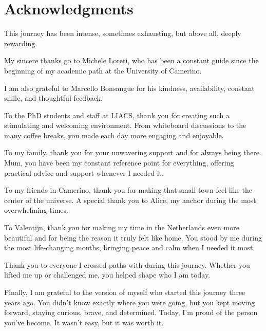 \chapter*{Acknowledgments}

This journey has been intense, sometimes exhausting, but above all, deeply rewarding.

My sincere thanks go to Michele Loreti, who has been a constant guide since the beginning of my academic path at the University of Camerino. 

I am also grateful to Marcello Bonsangue for his kindness, availability, constant smile, and thoughtful feedback.

To the PhD students and staff at LIACS, thank you for creating such a stimulating and welcoming environment. From whiteboard discussions to the many coffee breaks, you made each day more engaging and enjoyable.

To my family, thank you for your unwavering support and for always being there. Mum, you have been my constant reference point for everything, offering practical advice and support whenever I needed it.

To my friends in Camerino, thank you for making that small town feel like the center of the universe. A special thank you to Alice, my anchor during the most overwhelming times.

To Valentijn, thank you for making my time in the Netherlands even more beautiful and for being the reason it truly felt like home. You stood by me during the most life-changing months, bringing peace and calm when I needed it most.

Thank you to everyone I crossed paths with during this journey. Whether you lifted me up or challenged me, you helped shape who I am today.

Finally, I am grateful to the version of myself who started this journey three years ago. You didn't know exactly where you were going, but you kept moving forward, staying curious, brave, and determined. Today, I'm proud of the person you've become. It wasn't easy, but it was worth it.


